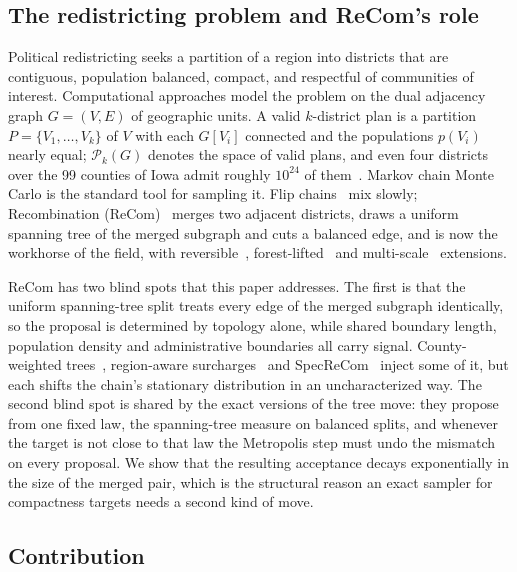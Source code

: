 \documentclass[11pt]{article}
\begin{document}
\subsection{The redistricting problem and ReCom's role}\label{sec:intro-problem}

Political redistricting seeks a partition of a region into districts
that are contiguous, population balanced, compact, and respectful of
communities of interest. Computational approaches model the problem
on the dual adjacency graph $G = (V,E)$ of geographic units. A valid
$k$-district plan is a partition $P = \{V_1, \ldots, V_k\}$ of $V$
with each $G[V_i]$ connected and the populations $p(V_i)$ nearly
equal; $\mathcal{P}_k(G)$ denotes the space of valid plans, and even
four districts over the 99 counties of Iowa admit roughly $10^{24}$ of
them~\cite{fifield2020essential}. Markov chain Monte Carlo is the
standard tool for sampling it. Flip chains~\cite{fifield2020automated}
mix slowly; Recombination (ReCom)~\cite{deford2021recombination}
merges two adjacent districts, draws a uniform spanning tree of the
merged subgraph and cuts a balanced edge, and is now the workhorse of
the field, with reversible~\cite{cannon2022spanning},
forest-lifted~\cite{autry2023metropolized} and
multi-scale~\cite{autry2020multiscale} extensions.

ReCom has two blind spots that this paper addresses. The first is
that the uniform spanning-tree split treats every edge of the merged
subgraph identically, so the proposal is determined by topology
alone, while shared boundary length, population density and
administrative boundaries all carry signal. County-weighted
trees~\cite{clelland2022colorado}, region-aware
surcharges~\cite{gerrychain2024} and SpecReCom~\cite{davies2025spectral}
inject some of it, but each shifts the chain's stationary distribution
in an uncharacterized way. The second blind spot is shared by the
exact versions of the tree move: they propose from one fixed law, the
spanning-tree measure on balanced splits, and whenever the target is
not close to that law the Metropolis step must undo the mismatch on
every proposal. We show that the resulting acceptance decays
exponentially in the size of the merged pair, which is the structural
reason an exact sampler for compactness targets needs a second kind
of move.

\subsection{Contribution}\label{sec:intro-contribution}
\end{document}
